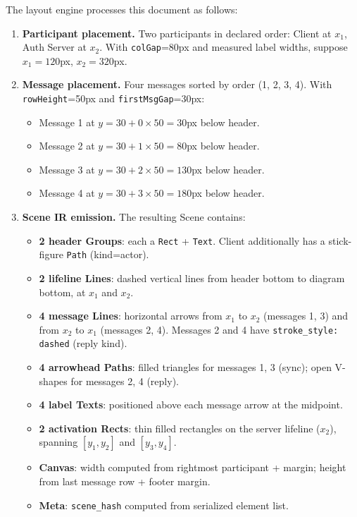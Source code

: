 The layout engine processes this document as follows:

\begin{enumerate}
  \item \textbf{Participant placement.} Two participants in declared order: Client at $x_1$, Auth Server at $x_2$. With \texttt{colGap}=80px and measured label widths, suppose $x_1 = 120$px, $x_2 = 320$px.

  \item \textbf{Message placement.} Four messages sorted by order (1, 2, 3, 4). With \texttt{rowHeight}=50px and \texttt{firstMsgGap}=30px:
  \begin{itemize}
    \item Message 1 at $y = 30 + 0 \times 50 = 30$px below header.
    \item Message 2 at $y = 30 + 1 \times 50 = 80$px below header.
    \item Message 3 at $y = 30 + 2 \times 50 = 130$px below header.
    \item Message 4 at $y = 30 + 3 \times 50 = 180$px below header.
  \end{itemize}

  \item \textbf{Scene IR emission.} The resulting Scene contains:
  \begin{itemize}
    \item \textbf{2 header Groups}: each a \texttt{Rect} + \texttt{Text}. Client additionally has a stick-figure \texttt{Path} (kind=actor).
    \item \textbf{2 lifeline Lines}: dashed vertical lines from header bottom to diagram bottom, at $x_1$ and $x_2$.
    \item \textbf{4 message Lines}: horizontal arrows from $x_1$ to $x_2$ (messages 1, 3) and from $x_2$ to $x_1$ (messages 2, 4). Messages 2 and 4 have \texttt{stroke\_style: dashed} (reply kind).
    \item \textbf{4 arrowhead Paths}: filled triangles for messages 1, 3 (sync); open V-shapes for messages 2, 4 (reply).
    \item \textbf{4 label Texts}: positioned above each message arrow at the midpoint.
    \item \textbf{2 activation Rects}: thin filled rectangles on the server lifeline ($x_2$), spanning $[y_1, y_2]$ and $[y_3, y_4]$.
    \item \textbf{Canvas}: width computed from rightmost participant + margin; height from last message row + footer margin.
    \item \textbf{Meta}: \texttt{scene\_hash} computed from serialized element list.
  \end{itemize}
\end{enumerate}

